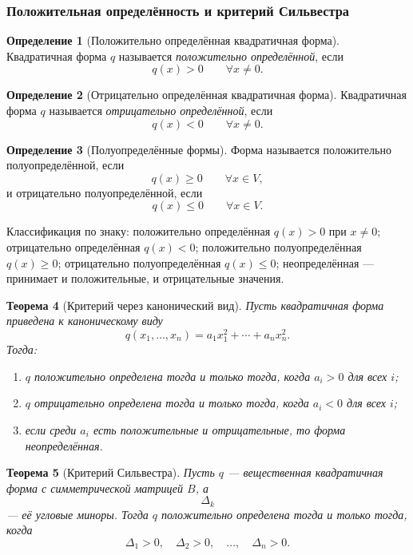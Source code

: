 \documentclass[12pt,a4paper]{article}
\theoremstyle{definition}
\newtheorem{definition}{Определение}[section]
\theoremstyle{plain}
\newtheorem{theorem}[definition]{Теорема}
\theoremstyle{remark}
\newenvironment{knowledgefix}{\begin{clarifybox}}{\end{clarifybox}}
\begin{document}
\subsubsection*{Положительная определённость и критерий Сильвестра}

\begin{definition}[Положительно определённая квадратичная форма]
Квадратичная форма $q$ называется \emph{положительно определённой}, если
\[
    q(x)>0
    \qquad \forall x\ne0.
\]
\end{definition}

\begin{definition}[Отрицательно определённая квадратичная форма]
Квадратичная форма $q$ называется \emph{отрицательно определённой}, если
\[
    q(x)<0
    \qquad \forall x\ne0.
\]
\end{definition}

\begin{definition}[Полуопределённые формы]
Форма называется положительно полуопределённой, если
\[
    q(x)\ge0
    \qquad \forall x\in V,
\]
и отрицательно полуопределённой, если
\[
    q(x)\le0
    \qquad \forall x\in V.
\]
\begin{knowledgefix}
Классификация по знаку: положительно определённая \(q(x)>0\) при \(x\ne0\); отрицательно определённая \(q(x)<0\); положительно полуопределённая \(q(x)\ge0\); отрицательно полуопределённая \(q(x)\le0\); неопределённая — принимает и положительные, и отрицательные значения.
\end{knowledgefix}
\end{definition}

\begin{theorem}[Критерий через канонический вид]
Пусть квадратичная форма приведена к каноническому виду
\[
    q(x_1,
    \ldots,x_n)=a_1x_1^2+
    \cdots+a_nx_n^2.
\]
Тогда:
\begin{enumerate}[label=\arabic*)]
    \item $q$ положительно определена тогда и только тогда, когда $a_i>0$ для всех $i$;
    \item $q$ отрицательно определена тогда и только тогда, когда $a_i<0$ для всех $i$;
    \item если среди $a_i$ есть положительные и отрицательные, то форма неопределённая.
\end{enumerate}
\end{theorem}

\begin{theorem}[Критерий Сильвестра]
Пусть $q$ --- вещественная квадратичная форма с симметрической матрицей $B$, а
\[
    \Delta_k
\]
--- её угловые миноры. Тогда $q$ положительно определена тогда и только тогда, когда
\[
    \Delta_1>0,
    \quad
    \Delta_2>0,
    \quad
    \ldots,
    \quad
    \Delta_n>0.
\]
\end{theorem}
\end{document}
